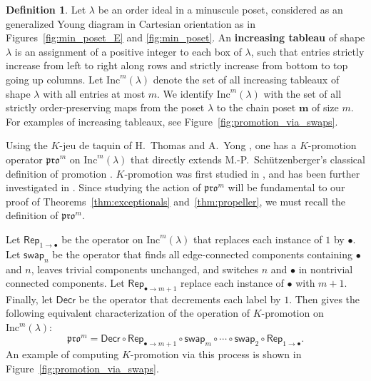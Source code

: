 \documentclass[12pt]{amsart}
\theoremstyle{definition}
\newtheorem{definition}[theorem]{Definition}
\theoremstyle{remark}
\numberwithin{equation}{section}
\newcommand{\inc}{\ensuremath{\mathrm{Inc}}}
\newcommand{\pro}{\mathfrak{pro}}
\newcommand{\swap}{\ensuremath{\mathsf{swap}}}
\newcommand{\decr}{\ensuremath{\mathsf{Decr}}}
\newcommand{\rep}{\ensuremath{\mathsf{Rep}}}
\begin{document}
\begin{definition}
Let $\lambda$ be an order ideal in a minuscule poset, considered as an generalized Young diagram in Cartesian orientation as in Figures~\ref{fig:min_poset_E} and \ref{fig:min_poset}. An {\bf increasing tableau} of shape $\lambda$ is an assignment of a positive integer to each box of $\lambda$, such that entries strictly increase from left to right along rows and strictly increase from bottom to top going up columns. Let $\inc^m(\lambda)$ denote the set of all increasing tableaux of shape $\lambda$ with all entries at most $m$. We identify $\inc^m(\lambda)$ with the set of all strictly order-preserving maps from the poset $\lambda$ to the chain poset $\mathbf{m}$ of size $m$. For examples of increasing tableaux, see Figure~\ref{fig:promotion_via_swaps}.
\end{definition}

Using the $K$-jeu de taquin of H.~Thomas and A.~Yong \cite{Thomas.Yong:K}, one has a $K$-promotion operator $\pro^m$ on $\inc^m(\lambda)$ that directly extends M.-P.~Sch\"utzenberger's classical definition of promotion \cite{Schutzenberger:promotion}. $K$-promotion was first studied in \cite{Pechenik}, and has been further investigated in \cite{BPS, Pressey.Stokke.Visentin, Rhoades:skein, DPS, Pechenik:frames,Vorland}. Since studying the action of $\pro^m$ will be fundamental to our proof of Theorems~\ref{thm:exceptionals} and~\ref{thm:propeller}, we must recall the definition of $\pro^m$. 

Let $\rep_{1 \rightarrow \bullet}$ be the operator on $\inc^m(\lambda)$ that replaces each instance of $1$ by $\bullet$. Let $\swap_n$ be the operator that finds all edge-connected components containing $\bullet$ and $n$, leaves trivial components unchanged, and switches $n$ and $\bullet$ in nontrivial connected components. Let $\rep_{\bullet \rightarrow m+1}$ replace each instance of $\bullet$ with $m+1$. Finally, let $\decr$ be the operator that decrements each label by $1$. Then \cite[Proposition~2.4]{DPS} gives the following equivalent characterization of the operation of $K$-promotion on $\inc^m(\lambda)$: 
\begin{equation}\label{eq:kprodef2}
\pro^m = \decr \circ \rep_{\bullet \rightarrow m+1} \circ \swap_m \circ \cdots \circ \swap_2 \circ \rep_{1 \rightarrow \bullet}.
\end{equation}
An example of computing $K$-promotion via this process is shown in Figure~\ref{fig:promotion_via_swaps}.
 
\end{document}
